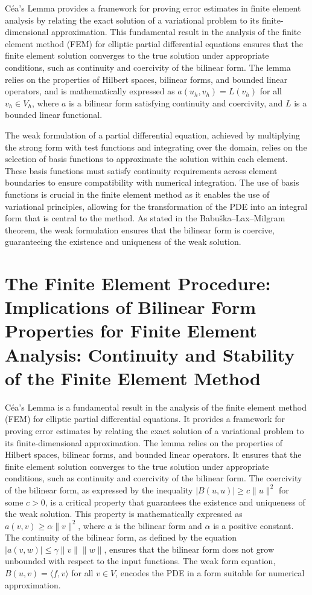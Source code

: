 \documentclass[12pt, a4paper]{article}
\begin{document}
Céa's Lemma provides a framework for proving error estimates in finite element analysis by relating the exact solution of a variational problem to its finite-dimensional approximation. This fundamental result in the analysis of the finite element method (FEM) for elliptic partial differential equations ensures that the finite element solution converges to the true solution under appropriate conditions, such as continuity and coercivity of the bilinear form. The lemma relies on the properties of Hilbert spaces, bilinear forms, and bounded linear operators, and is mathematically expressed as \(a(u_h, v_h) = L(v_h)\) for all \(v_h \in V_h\), where \(a\) is a bilinear form satisfying continuity and coercivity, and \(L\) is a bounded linear functional.

The weak formulation of a partial differential equation, achieved by multiplying the strong form with test functions and integrating over the domain, relies on the selection of basis functions to approximate the solution within each element. These basis functions must satisfy continuity requirements across element boundaries to ensure compatibility with numerical integration. The use of basis functions is crucial in the finite element method as it enables the use of variational principles, allowing for the transformation of the PDE into an integral form that is central to the method. As stated in the Babuška–Lax–Milgram theorem, the weak formulation ensures that the bilinear form is coercive, guaranteeing the existence and uniqueness of the weak solution.

\section{The Finite Element Procedure: Implications of Bilinear Form Properties for Finite Element Analysis: Continuity and Stability of the Finite Element Method}
\label{sec:af7144ac-f35e-4938-a21b-64ec68fba6f8}

Céa's Lemma is a fundamental result in the analysis of the finite element method (FEM) for elliptic partial differential equations. It provides a framework for proving error estimates by relating the exact solution of a variational problem to its finite-dimensional approximation. The lemma relies on the properties of Hilbert spaces, bilinear forms, and bounded linear operators. It ensures that the finite element solution converges to the true solution under appropriate conditions, such as continuity and coercivity of the bilinear form. The coercivity of the bilinear form, as expressed by the inequality \(|B(u, u)| \geq c\|u\|^2\) for some \(c > 0\), is a critical property that guarantees the existence and uniqueness of the weak solution. This property is mathematically expressed as \(a(v, v) \geq \alpha \|v\|^2\), where \(a\) is the bilinear form and \(\alpha\) is a positive constant. The continuity of the bilinear form, as defined by the equation \(|a(v, w)| \leq \gamma \|v\| \|w\|\), ensures that the bilinear form does not grow unbounded with respect to the input functions. The weak form equation, \(B(u, v) = \langle f, v \rangle\) for all \(v \in V\), encodes the PDE in a form suitable for numerical approximation.
\end{document}
